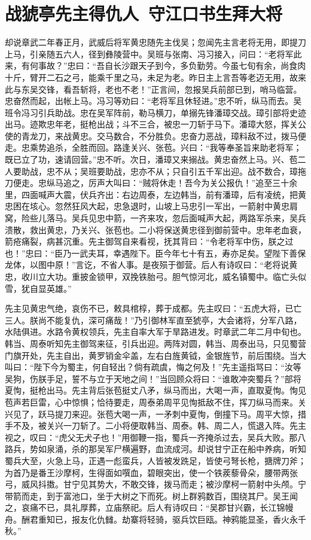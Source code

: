 \chapter{战猇亭先主得仇人~守江口书生拜大将}

却说章武二年春正月，武威后将军黄忠随先主伐吴；忽闻先主言老将无用，即提刀上马，引亲随五六人，径到彝陵营中。吴班与张南、冯习接入，问曰：“老将军此来，有何事故？”忠曰：“吾自长沙跟天子到今，多负勤劳。今虽七旬有余，尚食肉十斤，臂开二石之弓，能乘千里之马，未足为老。昨日主上言吾等老迈无用，故来此与东吴交锋，看吾斩将，老也不老！”正言间，忽报吴兵前部已到，哨马临营。忠奋然而起，出帐上马。冯习等劝曰：“老将军且休轻进。”忠不听，纵马而去。吴班令冯习引兵助战。忠在吴军阵前，勒马横刀，单搦先锋潘璋交战。璋引部将史迹出马。迹欺忠年老，挺枪出战；斗不三合，被忠一刀斩于马下。潘璋大怒，挥关公使的青龙刀，来战黄忠。交马数合，不分胜负。忠奋力恶战，璋料敌不过，拨马便走。忠乘势追杀，全胜而回。路逢关兴、张苞。兴曰：“我等奉圣旨来助老将军；既已立了功，速请回营。”忠不听。次日，潘璋又来搦战。黄忠奋然上马。兴、苞二人要助战，忠不从；吴班要助战，忠亦不从；只自引五千军出迎。战不数合，璋拖刀便走。忠纵马追之，厉声大叫曰：“贼将休走！吾今为关公报仇！”追至三十余里，四面喊声大震，伏兵齐出：右边周泰，左边韩当，前有潘璋，后有凌统，把黄忠困在垓心。忽然狂风大起，忠急退时，山坡上马忠引一军出，一箭射中黄忠肩窝，险些儿落马。吴兵见忠中箭，一齐来攻，忽后面喊声大起，两路军杀来，吴兵溃散，救出黄忠，乃关兴、张苞也。二小将保送黄忠径到御前营中。忠年老血衰，箭疮痛裂，病甚沉重。先主御驾自来看视，抚其背曰：“令老将军中伤，朕之过也！”忠曰：“臣乃一武夫耳，幸遇陛下。臣今年七十有五，寿亦足矣。望陛下善保龙体，以图中原！”言讫，不省人事。是夜殒于御营。后人有诗叹曰：“老将说黄忠，收川立大功。重披金锁甲，双挽铁胎弓。胆气惊河北，威名镇蜀中。临亡头似雪，犹自显英雄。”

先主见黄忠气绝，哀伤不已，敕具棺椁，葬于成都。先主叹曰：“五虎大将，已亡三人。朕尚不能复仇，深可痛哉！”乃引御林军直至猇亭，大会诸将，分军八路，水陆俱进。水路令黄权领兵，先主自率大军于旱路进发。时章武二年二月中旬也。韩当、周泰听知先主御驾来征，引兵出迎。两阵对圆，韩当、周泰出马，只见蜀营门旗开处，先主自出，黄罗销金伞盖，左右白旌黄钺，金银旌节，前后围绕。当大叫曰：“陛下今为蜀主，何自轻出？倘有疏虞，悔之何及！”先主遥指骂曰：“汝等吴狗，伤朕手足，誓不与立于天地之间！”当回顾众将曰：“谁敢冲突蜀兵？”部将夏恂，挺枪出马。先主背后张苞挺丈八矛，纵马而出，大喝一声，直取夏恂。恂见苞声若巨雷，心中惊惧；恰待要走，周泰弟周平见恂抵敌不住，挥刀纵马而来。关兴见了，跃马提刀来迎。张苞大喝一声，一矛刺中夏恂，倒撞下马。周平大惊，措手不及，被关兴一刀斩了。二小将便取韩当、周泰。韩、周二人，慌退入阵。先主视之，叹曰：“虎父无犬子也！”用御鞭一指，蜀兵一齐掩杀过去，吴兵大败。那八路兵，势如泉涌，杀的那吴军尸横遍野，血流成河。却说甘宁正在船中养病，听知蜀兵大至，火急上马，正遇一彪蛮兵，人皆被发跣足，皆使弓弩长枪，搪牌刀斧；为首乃是番王沙摩柯，生得面如噀血，碧眼突出，使一个铁蒺藜骨朵，腰带两张弓，威风抖擞。甘宁见其势大，不敢交锋，拨马而走；被沙摩柯一箭射中头颅。宁带箭而走，到于富池口，坐于大树之下而死。树上群鸦数百，围绕其尸。吴王闻之，哀痛不已，具礼厚葬，立庙祭祀。后人有诗叹曰：“吴郡甘兴霸，长江锦幔舟。酬君重知已，报友化仇雠。劫寨将轻骑，驱兵饮巨瓯。神鸦能显圣，香火永千秋。”

